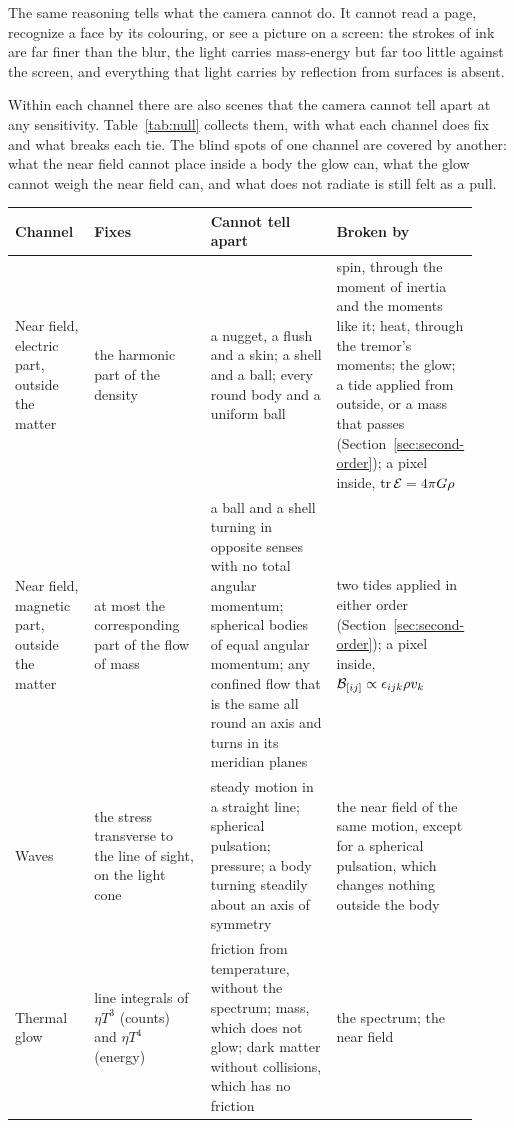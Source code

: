 The same reasoning tells what the camera cannot do. It cannot read a page,
recognize a face by its colouring, or see a picture on a screen: the strokes
of ink are far finer than the blur, the light carries mass-energy but far too
little against the screen, and everything that light carries by reflection
from surfaces is absent.

Within each channel there are also scenes that the camera cannot tell apart at
any sensitivity. Table~\ref{tab:null} collects them, with what each channel does fix and what breaks each tie. The blind
spots of one channel are covered by another: what the near field cannot place
inside a body the glow can, what the glow cannot weigh the near field can, and
what does not radiate is still felt as a pull.

\begin{table}
\centering
\begin{tabular}{p{0.17\linewidth}p{0.25\linewidth}p{0.27\linewidth}p{0.23\linewidth}}
Channel & Fixes & Cannot tell apart & Broken by \\ \hline
Near field, electric part, outside the matter & the harmonic part of the density & a nugget, a flush and a skin; a shell and a ball; every round body and a uniform ball & spin, through the moment of inertia and the moments like it; heat, through the tremor's moments; the glow; a tide applied from outside, or a mass that passes (Section~\ref{sec:second-order}); a pixel inside, $\mathrm{tr}\,\mathcal{E} = 4\pi G\rho$ \\
Near field, magnetic part, outside the matter & at most the corresponding part of the flow of mass & a ball and a shell turning in opposite senses with no total angular momentum; spherical bodies of equal angular momentum; any confined flow that is the same all round an axis and turns in its meridian planes & two tides applied in either order (Section~\ref{sec:second-order}); a pixel inside, $\mathcal{B}_{[ij]} \propto \epsilon_{ijk}\rho v_k$ \\
Waves & the stress transverse to the line of sight, on the light cone & steady motion in a straight line; spherical pulsation; pressure; a body turning steadily about an axis of symmetry & the near field of the same motion, except for a spherical pulsation, which changes nothing outside the body \\
Thermal glow & line integrals of $\eta T^3$ (counts) and $\eta T^4$ (energy) & friction from temperature, without the spectrum; mass, which does not glow; dark matter without collisions, which has no friction & the spectrum; the near field \\

\end{tabular}
\end{table}
